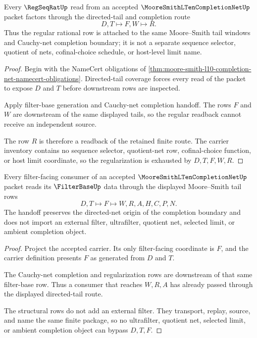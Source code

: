 \begin{theorem}\label{thm:moore-smith-l10-completion-net-regularization}
Every $\RegSeqRatUp$ read from an accepted $\MooreSmithLTenCompletionNetUp$ packet factors through the directed-tail and completion route
$$
D,T \longmapsto F,W \longmapsto R .
$$
Thus the regular rational row is attached to the same Moore--Smith tail windows and Cauchy-net completion boundary; it is not a separate sequence selector, quotient of nets, cofinal-choice schedule, or host-level limit name.
\end{theorem}
\begin{proof}
Begin with the NameCert obligations of \autoref{thm:moore-smith-l10-completion-net-namecert-obligations}. Directed-tail coverage forces every read of the packet to expose $D$ and $T$ before downstream rows are inspected.

Apply filter-base generation and Cauchy-net completion handoff. The rows $F$ and $W$ are downstream of the same displayed tails, so the regular readback cannot receive an independent source.

The row $R$ is therefore a readback of the retained finite route. The carrier inventory contains no sequence selector, quotient-net row, cofinal-choice function, or host limit coordinate, so the regularization is exhausted by $D,T,F,W,R$.
\end{proof}

\begin{theorem}\label{thm:moore-smith-l10-completion-net-filter-handoff}
Every filter-facing consumer of an accepted $\MooreSmithLTenCompletionNetUp$ packet reads its $\FilterBaseUp$ data through the displayed Moore--Smith tail rows
$$
D,T \longmapsto F \longmapsto W,R,A,H,C,P,N .
$$
The handoff preserves the directed-net origin of the completion boundary and does not import an external filter, ultrafilter, quotient net, selected limit, or ambient completion object.
\end{theorem}
\begin{proof}
Project the accepted carrier. Its only filter-facing coordinate is $F$, and the carrier definition presents $F$ as generated from $D$ and $T$.

The Cauchy-net completion and regularization rows are downstream of that same filter-base row. Thus a consumer that reaches $W,R,A$ has already passed through the displayed directed-tail route.

The structural rows do not add an external filter. They transport, replay, source, and name the same finite package, so no ultrafilter, quotient net, selected limit, or ambient completion object can bypass $D,T,F$.
\end{proof}

